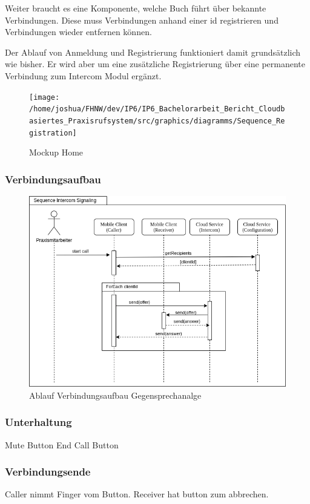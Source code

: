 \clearpage
Weiter braucht es eine Komponente, welche Buch führt über bekannte Verbindungen.
Diese muss Verbindungen anhand einer id registrieren und Verbindungen wieder entfernen können.



Der Ablauf von Anmeldung und Registrierung funktioniert damit grundsätzlich wie bisher.
Er wird aber um eine zusätzliche Registrierung über eine permanente Verbindung zum Intercom Modul ergänzt.

\begin{figure}[h]
    \centering
    \begin{minipage}[b]{0.9\textwidth}
        \texttt{[image: /home/joshua/FHNW/dev/IP6/IP6\_Bachelorarbeit\_Bericht\_Cloudbasiertes\_Praxisrufsystem/src/graphics/diagramms/Sequence\_Registration]}
        \caption{Mockup Home}
    \end{minipage}
\end{figure}


\clearpage

\subsubsection*{Verbindungsaufbau}

\begin{figure}[h]
    \centering
    \begin{minipage}[b]{0.9\textwidth}
        \includegraphics[width=\textwidth]{graphics/diagramms/Sequence_Intercom_Broking_V02}
        \caption{Ablauf Verbindungsaufbau Gegensprechanalge}
    \end{minipage}
\end{figure}



\subsubsection*{Unterhaltung}

Mute Button
End Call Button


\subsubsection*{Verbindungsende}

Caller nimmt Finger vom Button.
Receiver hat button zum abbrechen.

\clearpage
